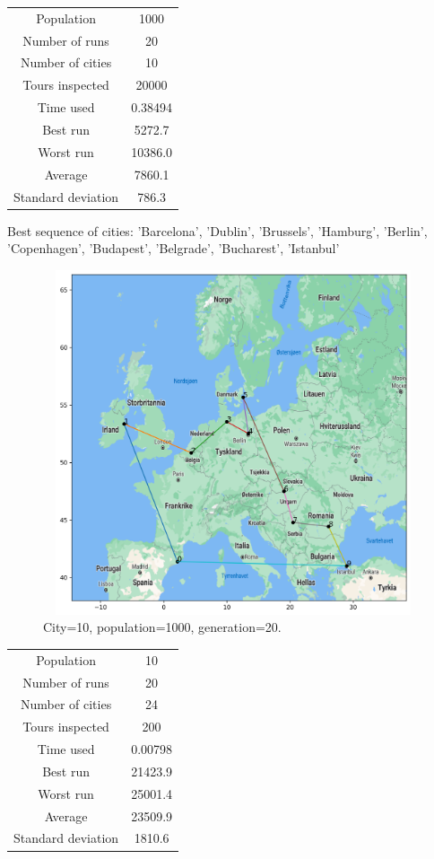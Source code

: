 \documentclass[a4paper,12pt]{article}
\begin{document}
\begin{center}
\begin{tabular}{ c c}
 Population & 1000  \\ 
 Number of runs & 20  \\ 
 Number of cities & 10  \\  
Tours inspected & 20000  \\
 Time used & 0.38494   \\  
 Best run & 5272.7  \\ 
Worst run &  10386.0 \\ 
Average & 7860.1  \\ 
 Standard deviation & 786.3 \\ 


\end{tabular}
\end{center}
Best sequence of cities: 'Barcelona', 'Dublin', 'Brussels', 'Hamburg', 'Berlin', 'Copenhagen', 'Budapest', 'Belgrade', 'Bucharest', 'Istanbul'\\ 
\begin{figure}[H]
\centerline{\includegraphics[width=6in, height=4in]{geneticMap3.png}}
\caption{City=10, population=1000, generation=20.}
\label{fig}
\end{figure}
 
\begin{center}
\begin{tabular}{ c c}
 Population & 10  \\ 
 Number of runs & 20  \\ 
 Number of cities & 24  \\  
Tours inspected & 200  \\
 Time used & 0.00798   \\  
 Best run & 21423.9  \\ 
Worst run &  25001.4  \\ 
Average & 23509.9  \\ 
 Standard deviation & 1810.6   \\ 
\end{tabular}
\end{center}
\end{document}
